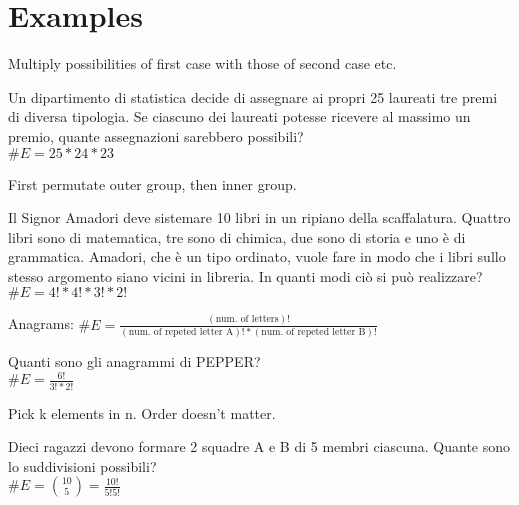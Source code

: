 \section{Examples}
Multiply possibilities of first case with those of second case etc.
\begin{example}
Un dipartimento di statistica decide di assegnare ai propri 25 laureati tre premi di diversa tipologia. Se ciascuno dei laureati potesse ricevere al massimo un premio, quante assegnazioni sarebbero possibili?\\
$\#E = 25*24*23$
\end{example}
\medskip
First permutate outer group, then inner group.
\begin{example}
Il Signor Amadori deve sistemare 10 libri in un ripiano della scaffalatura. Quattro libri sono di matematica, tre sono di chimica, due sono di storia e uno è di grammatica. Amadori, che è un tipo ordinato, vuole fare in modo che i libri sullo stesso argomento siano vicini in libreria. In quanti modi ciò si può realizzare?\\
$\#E = 4!*4!*3!*2!$
\end{example}
\medskip
Anagrams: $\#E = \frac{(\text{num. of letters})!}{(\text{num. of repeted letter A})!*(\text{num. of repeted letter B})!}$
\begin{example}
Quanti sono gli anagrammi di PEPPER?\\
$\#E = \frac{6!}{3!*2!}$
\end{example}
\medskip
Pick k elements in n. Order doesn't matter.
\begin{example}
Dieci ragazzi devono formare 2 squadre A e B di 5 membri ciascuna. Quante sono lo suddivisioni possibili?\\
$\#E = \binom{10}{5}=\frac{10!}{5!5!}$
\end{example}